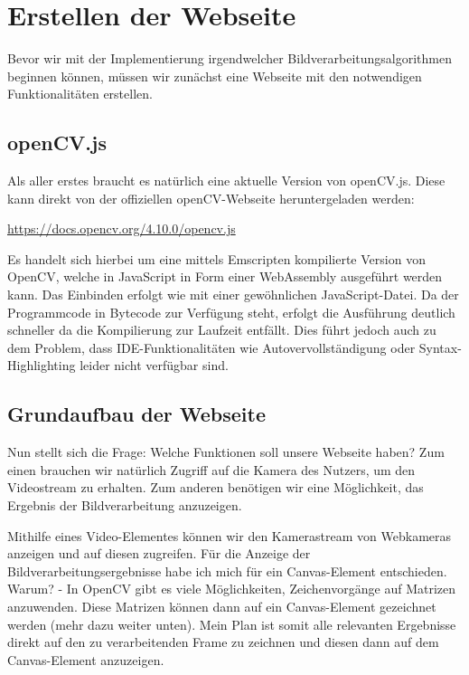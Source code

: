 \section{Erstellen der Webseite}
Bevor wir mit der Implementierung irgendwelcher Bildverarbeitungsalgorithmen beginnen können, müssen wir zunächst eine Webseite mit den notwendigen Funktionalitäten erstellen.

\subsection{openCV.js}
Als aller erstes braucht es natürlich eine aktuelle Version von openCV.js. Diese kann direkt von der offiziellen openCV-Webseite heruntergeladen werden:

\href{https://docs.opencv.org/4.10.0/opencv.js}{https://docs.opencv.org/4.10.0/opencv.js}

Es handelt sich hierbei um eine mittels Emscripten kompilierte Version von OpenCV, welche in JavaScript in Form einer WebAssembly ausgeführt werden kann. Das Einbinden erfolgt wie mit einer gewöhnlichen JavaScript-Datei. Da der Programmcode in Bytecode zur Verfügung steht, erfolgt die Ausführung deutlich schneller da die Kompilierung zur Laufzeit entfällt. Dies führt jedoch auch zu dem Problem, dass IDE-Funktionalitäten wie Autovervollständigung oder Syntax-Highlighting leider nicht verfügbar sind.

\subsection{Grundaufbau der Webseite}
Nun stellt sich die Frage: Welche Funktionen soll unsere Webseite haben? Zum einen brauchen wir natürlich Zugriff auf die Kamera des Nutzers, um den Videostream zu erhalten. Zum anderen benötigen wir eine Möglichkeit, das Ergebnis der Bildverarbeitung anzuzeigen.

Mithilfe eines Video-Elementes können wir den Kamerastream von Webkameras anzeigen und auf diesen zugreifen. Für die Anzeige der Bildverarbeitungsergebnisse habe ich mich für ein Canvas-Element entschieden. Warum? - In OpenCV gibt es viele Möglichkeiten, Zeichenvorgänge auf Matrizen anzuwenden. Diese Matrizen können dann auf ein Canvas-Element gezeichnet werden (mehr dazu weiter unten). Mein Plan ist somit alle relevanten Ergebnisse direkt auf den zu verarbeitenden Frame zu zeichnen und diesen dann auf dem Canvas-Element anzuzeigen.

